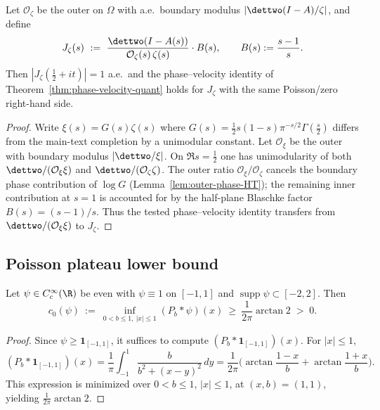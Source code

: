 \begin{lemma}\label{lem:zeta-normalization}
Let \(\mathcal O_\zeta\) be the outer on \(\Omega\) with a.e.\ boundary modulus \(|\dettwo(I-A)/\zeta|\), and define
\[
  J_\zeta(s)\ :=\ \frac{\dettwo(I-A(s))}{\mathcal O_\zeta(s)\,\zeta(s)}\cdot B(s),
  \qquad B(s):=\frac{s-1}{s}.
\]
Then \(|J_\zeta(\tfrac12+it)|=1\) a.e.\ and the phase--velocity identity of Theorem~\ref{thm:phase-velocity-quant} holds for \(J_\zeta\) with the same Poisson/zero right-hand side.
\end{lemma}
\begin{proof}
Write \(\xi(s)=G(s)\zeta(s)\) where \(G(s)=\tfrac12 s(1-s)\pi^{-s/2}\Gamma(\tfrac s2)\) differs from the main-text completion by a unimodular constant.
Let \(\mathcal O_\xi\) be the outer with boundary modulus \(|\dettwo/\xi|\).
On \(\Re s=\tfrac12\) one has unimodularity of both \(\dettwo/(\mathcal O_\xi\xi)\) and \(\dettwo/(\mathcal O_\zeta\zeta)\).
The outer ratio \(\mathcal O_\xi/\mathcal O_\zeta\) cancels the boundary phase contribution of \(\log G\) (Lemma~\ref{lem:outer-phase-HT}); the remaining inner contribution at \(s=1\) is accounted for by the half-plane Blaschke factor \(B(s)=(s-1)/s\).
Thus the tested phase--velocity identity transfers from \(\dettwo/(\mathcal O_\xi\xi)\) to \(J_\zeta\).
\end{proof}

\subsection*{Poisson plateau lower bound}
\begin{lemma}\label{lem:poisson-plateau}
Let \(\psi\in C_c^\infty(\R)\) be even with \(\psi\equiv 1\) on \([-1,1]\) and \(\operatorname{supp}\psi\subset[-2,2]\).
Then
\[
  c_0(\psi)\ :=\ \inf_{0<b\le 1,\ |x|\le 1} (P_b*\psi)(x)\ \ge\ \frac{1}{2\pi}\arctan 2\;>\;0.
\]
\end{lemma}
\begin{proof}
Since \(\psi\ge \mathbf 1_{[-1,1]}\), it suffices to compute \((P_b*\mathbf 1_{[-1,1]})(x)\).
For \(|x|\le 1\),
\[
 (P_b*\mathbf 1_{[-1,1]})(x)
 =\frac{1}{\pi}\int_{-1}^{1}\frac{b}{b^2+(x-y)^2}\,dy
 =\frac{1}{2\pi}\Big(\arctan\frac{1-x}{b}+\arctan\frac{1+x}{b}\Big).
\]
This expression is minimized over \(0<b\le 1\), \(|x|\le 1\), at \((x,b)=(1,1)\), yielding \(\frac{1}{2\pi}\arctan 2\).
\end{proof}

